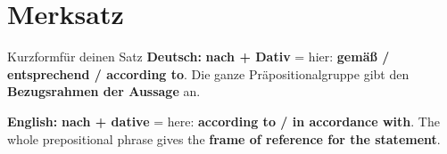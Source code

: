 \documentclass[a4paper,11pt]{article}
\newcommand{\GermanText}[1]{\textbf{Deutsch: }#1\par}
\newcommand{\EnglishText}[1]{{\small\color{SoftGray}\textbf{English: }#1\par}}
\begin{document}
\section{Merksatz}

\begin{grammarentry}{Kurzform}{für deinen Satz}
\GermanText{\textbf{nach + Dativ} = hier: \textbf{gemäß / entsprechend / according to}. Die ganze Präpositionalgruppe gibt den \textbf{Bezugsrahmen der Aussage} an.}
\EnglishText{\textbf{nach + dative} = here: \textbf{according to / in accordance with}. The whole prepositional phrase gives the \textbf{frame of reference for the statement}.}
\end{grammarentry}
\end{document}
